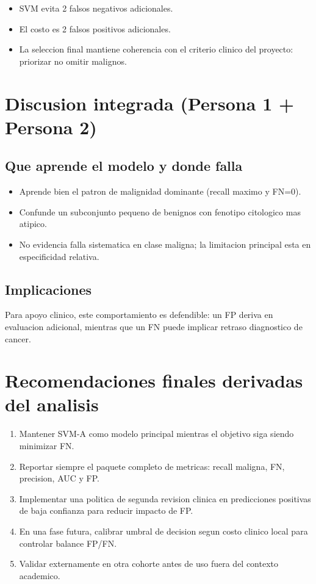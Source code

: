 \documentclass[11pt,a4paper]{article}
\begin{document}
\begin{itemize}[leftmargin=1.2cm]
\item SVM evita 2 falsos negativos adicionales.
\item El costo es 2 falsos positivos adicionales.
\item La seleccion final mantiene coherencia con el criterio clinico del proyecto: priorizar no omitir malignos.
\end{itemize}

\section{Discusion integrada (Persona 1 + Persona 2)}

\subsection{Que aprende el modelo y donde falla}

\begin{itemize}[leftmargin=1.2cm]
\item Aprende bien el patron de malignidad dominante (recall maximo y FN=0).
\item Confunde un subconjunto pequeno de benignos con fenotipo citologico mas atipico.
\item No evidencia falla sistematica en clase maligna; la limitacion principal esta en especificidad relativa.
\end{itemize}

\subsection{Implicaciones}

Para apoyo clinico, este comportamiento es defendible: un FP deriva en evaluacion adicional, mientras que un FN puede implicar retraso diagnostico de cancer.

\section{Recomendaciones finales derivadas del analisis}

\begin{enumerate}[leftmargin=1.2cm]
\item Mantener SVM-A como modelo principal mientras el objetivo siga siendo minimizar FN.
\item Reportar siempre el paquete completo de metricas: recall maligna, FN, precision, AUC y FP.
\item Implementar una politica de segunda revision clinica en predicciones positivas de baja confianza para reducir impacto de FP.
\item En una fase futura, calibrar umbral de decision segun costo clinico local para controlar balance FP/FN.
\item Validar externamente en otra cohorte antes de uso fuera del contexto academico.
\end{enumerate}
\end{document}
